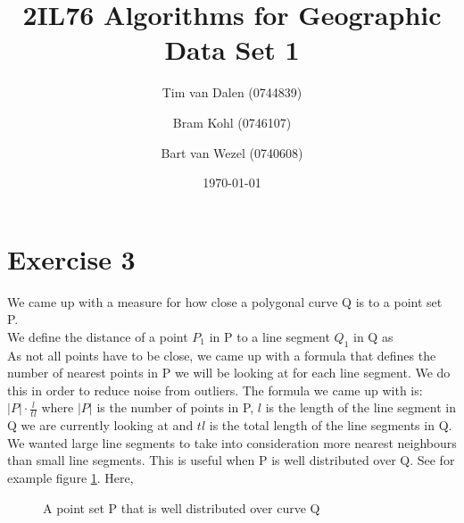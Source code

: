 \documentclass[a4paper,11pt]{article}
\title{
	2IL76 Algorithms for Geographic Data Set 1 \\
}
\author{
	Tim van Dalen (0744839)
	\and
	Bram Kohl (0746107)
	\and
	Bart van Wezel (0740608)
}
\date{\today}
\begin{document}
	\maketitle
	
\section*{Exercise 3}
We came up with a measure for how close a polygonal curve Q is to a point set P.\\

We define the distance of a point $P_1$ in P to a line segment $Q_1$ in Q as \\%

As not all points have to be close, we came up with a formula that defines the number of nearest points in P we will be looking at for each line segment. We do this in order to reduce noise from outliers. The formula we came up with is: $|P|\cdot \frac{l}{tl}$ where $|P|$ is the number of points in P, $l$ is the length of the line segment in Q we are currently looking at and $tl$ is the total length of the line segments in Q.\\

We wanted large line segments to take into consideration more nearest neighbours than small line segments. This is useful when P is well distributed over Q. See for example figure \ref{fig:line-weight}. Here, 

\begin{figure}
	\label{fig:line-weight}
	\caption{A point set P that is well distributed over curve Q}
\end{figure}

 
\end{document}
